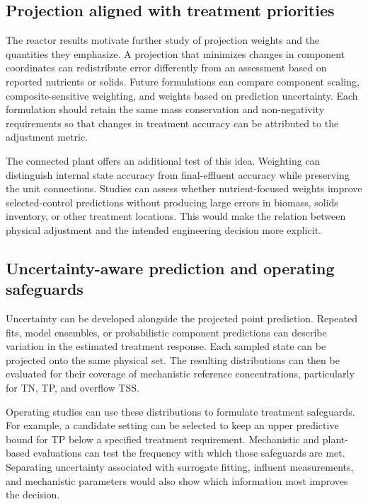 \subsection{Projection aligned with treatment priorities}

The reactor results motivate further study of projection weights and the quantities they emphasize. A projection that minimizes changes in component coordinates can redistribute error differently from an assessment based on reported nutrients or solids. Future formulations can compare component scaling, composite-sensitive weighting, and weights based on prediction uncertainty. Each formulation should retain the same mass conservation and non-negativity requirements so that changes in treatment accuracy can be attributed to the adjustment metric.

The connected plant offers an additional test of this idea. Weighting can distinguish internal state accuracy from final-effluent accuracy while preserving the unit connections. Studies can assess whether nutrient-focused weights improve selected-control predictions without producing large errors in biomass, solids inventory, or other treatment locations. This would make the relation between physical adjustment and the intended engineering decision more explicit.

\subsection{Uncertainty-aware prediction and operating safeguards}

Uncertainty can be developed alongside the projected point prediction. Repeated fits, model ensembles, or probabilistic component predictions can describe variation in the estimated treatment response. Each sampled state can be projected onto the same physical set. The resulting distributions can then be evaluated for their coverage of mechanistic reference concentrations, particularly for TN, TP, and overflow TSS.

Operating studies can use these distributions to formulate treatment safeguards. For example, a candidate setting can be selected to keep an upper predictive bound for TP below a specified treatment requirement. Mechanistic and plant-based evaluations can test the frequency with which those safeguards are met. Separating uncertainty associated with surrogate fitting, influent measurements, and mechanistic parameters would also show which information most improves the decision.

